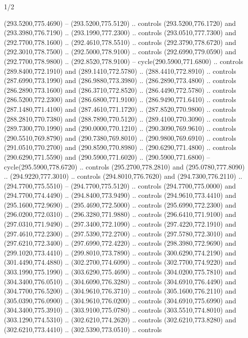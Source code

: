 \begin{flagdescription}{1/2}
\begin{scope}[xshift=0.5\flaglength]
\begin{scope}[scale=0.00745\flagwidth,xshift=-12.1mm,yshift=41.7mm]
\begin{scope}[y=0.80pt, x=0.80pt, yscale=-1, xscale=1, inner sep=0pt, outer sep=0pt]
\begin{scope}[cm={{1.33333,0.0,0.0,-1.33333,(0.0,114.66667)}}]
\begin{scope}[scale=0.100]
  (293.5200,775.4690) -- (293.5200,775.5120) .. controls (293.5200,776.1720) and
  (293.3980,776.7190) .. (293.1990,777.2300) .. controls (293.0510,777.7300) and
  (292.7700,778.1600) .. (292.4610,778.5510) .. controls (292.3790,778.6720) and
  (292.3010,778.7500) .. (292.5000,778.9100) .. controls (292.6990,779.0590) and
  (292.7700,778.9800) .. (292.8520,778.9100) -- cycle(290.5900,771.6800) ..
  controls (289.8400,772.1910) and (289.1410,772.5780) .. (288.4410,772.8910) ..
  controls (287.6990,773.1990) and (286.9880,773.3980) .. (286.2890,773.4800) ..
  controls (286.2890,773.1600) and (286.3710,772.8520) .. (286.4490,772.5780) ..
  controls (286.5200,772.2300) and (286.6800,771.9100) .. (286.9490,771.6410) ..
  controls (287.1480,771.4100) and (287.4610,771.1720) .. (287.8520,770.9800) ..
  controls (288.2810,770.7380) and (288.7890,770.5120) .. (289.4100,770.3090) ..
  controls (289.7300,770.1990) and (290.0000,770.1210) .. (290.3090,769.9610) ..
  controls (290.5510,769.8790) and (290.7380,769.8010) .. (290.9800,769.6910) ..
  controls (291.0510,770.2700) and (290.8590,770.8980) .. (290.6290,771.4800) ..
  controls (290.6290,771.5590) and (290.5900,771.6020) .. (290.5900,771.6800) --
  cycle(295.5900,778.6720) .. controls (295.2700,778.2810) and
  (295.0780,777.8090) .. (294.9220,777.3010) .. controls (294.8010,776.7620) and
  (294.7300,776.2110) .. (294.7700,775.5510) -- (294.7700,775.5120) .. controls
  (294.7700,775.0000) and (294.7700,774.4490) .. (294.8400,773.9490) .. controls
  (294.9610,773.4410) and (295.1600,772.9690) .. (295.4690,772.5000) .. controls
  (295.6990,772.2300) and (296.0200,772.0310) .. (296.3280,771.9880) .. controls
  (296.6410,771.9100) and (297.0310,771.9490) .. (297.3400,772.1090) .. controls
  (297.4220,772.1910) and (297.4610,772.2300) .. (297.5390,772.2700) .. controls
  (297.5780,772.3010) and (297.6210,772.3400) .. (297.6990,772.4220) .. controls
  (298.3980,772.9690) and (299.1020,773.4410) .. (299.8010,773.7890) .. controls
  (300.6290,774.2190) and (301.4490,774.4880) .. (302.2700,774.6090) .. controls
  (302.7700,774.9220) and (303.1990,775.1990) .. (303.6290,775.4690) .. controls
  (304.0200,775.7810) and (304.3400,776.0510) .. (304.6090,776.3280) .. controls
  (304.6910,776.4490) and (304.7700,776.5200) .. (304.9610,776.3710) .. controls
  (305.1600,776.2110) and (305.0390,776.0900) .. (304.9610,776.0200) .. controls
  (304.6910,775.6990) and (304.3400,775.3910) .. (303.9100,775.0780) .. controls
  (303.5510,774.8010) and (303.1290,774.5310) .. (302.6210,774.2620) .. controls
  (302.6210,773.8280) and (302.6210,773.4410) .. (302.5390,773.0510) .. controls

\end{scope}
\end{scope}
\end{scope}
\end{scope}
\end{scope}
\end{flagdescription}
